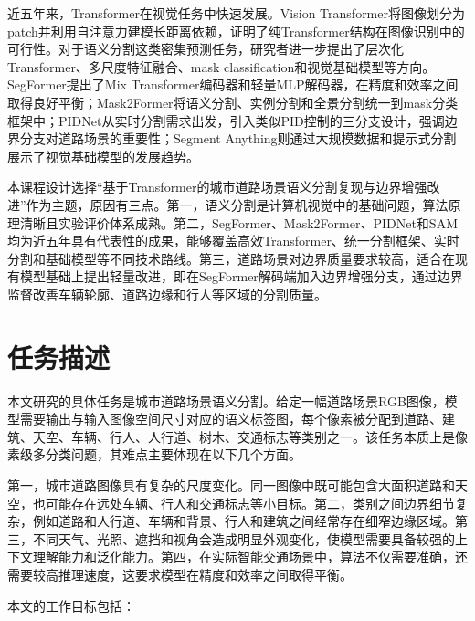 \documentclass{report}
\begin{document}
近五年来，Transformer在视觉任务中快速发展。Vision Transformer将图像划分为patch并利用自注意力建模长距离依赖，证明了纯Transformer结构在图像识别中的可行性。对于语义分割这类密集预测任务，研究者进一步提出了层次化Transformer、多尺度特征融合、mask classification和视觉基础模型等方向。SegFormer提出了Mix Transformer编码器和轻量MLP解码器，在精度和效率之间取得良好平衡\cite{segformer}；Mask2Former将语义分割、实例分割和全景分割统一到mask分类框架中\cite{mask2former}；PIDNet从实时分割需求出发，引入类似PID控制的三分支设计，强调边界分支对道路场景的重要性\cite{pidnet}；Segment Anything则通过大规模数据和提示式分割展示了视觉基础模型的发展趋势\cite{sam}。

本课程设计选择“基于Transformer的城市道路场景语义分割复现与边界增强改进”作为主题，原因有三点。第一，语义分割是计算机视觉中的基础问题，算法原理清晰且实验评价体系成熟。第二，SegFormer、Mask2Former、PIDNet和SAM均为近五年具有代表性的成果，能够覆盖高效Transformer、统一分割框架、实时分割和基础模型等不同技术路线。第三，道路场景对边界质量要求较高，适合在现有模型基础上提出轻量改进，即在SegFormer解码端加入边界增强分支，通过边界监督改善车辆轮廓、道路边缘和行人等区域的分割质量。

\section{任务描述}

本文研究的具体任务是城市道路场景语义分割。给定一幅道路场景RGB图像，模型需要输出与输入图像空间尺寸对应的语义标签图，每个像素被分配到道路、建筑、天空、车辆、行人、人行道、树木、交通标志等类别之一。该任务本质上是像素级多分类问题，其难点主要体现在以下几个方面。

第一，城市道路图像具有复杂的尺度变化。同一图像中既可能包含大面积道路和天空，也可能存在远处车辆、行人和交通标志等小目标。第二，类别之间边界细节复杂，例如道路和人行道、车辆和背景、行人和建筑之间经常存在细窄边缘区域。第三，不同天气、光照、遮挡和视角会造成明显外观变化，使模型需要具备较强的上下文理解能力和泛化能力。第四，在实际智能交通场景中，算法不仅需要准确，还需要较高推理速度，这要求模型在精度和效率之间取得平衡。

本文的工作目标包括：
\end{document}
